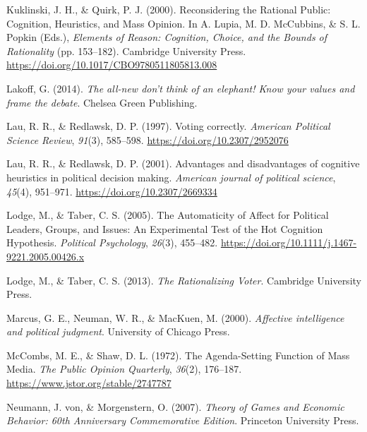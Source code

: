 \documentclass[
]{article}
\newlength{\cslhangindent}
\newlength{\cslentryspacingunit} %
\newenvironment{CSLReferences}[2] %
 {%
  \setlength{\parindent}{0pt}
  \ifodd #1
  \let\oldpar\par
  \def\par{\hangindent=\cslhangindent\oldpar}
  \fi
  \setlength{\parskip}{#2\cslentryspacingunit}
 }%
 {}
\begin{document}
\begin{CSLReferences}{1}{0}
\leavevmode{}%
Kuklinski, J. H., \& Quirk, P. J. (2000). Reconsidering the {Rational
Public}: {Cognition}, {Heuristics}, and {Mass Opinion}. In A. Lupia, M.
D. McCubbins, \& S. L. Popkin (Eds.), \emph{Elements of {Reason}:
{Cognition}, {Choice}, and the {Bounds} of {Rationality}} (pp.
153--182). {Cambridge University Press}.
\url{https://doi.org/10.1017/CBO9780511805813.008}

\leavevmode{}%
Lakoff, G. (2014). \emph{The all-new don't think of an elephant! Know
your values and frame the debate}. {Chelsea Green Publishing}.

\leavevmode{}%
Lau, R. R., \& Redlawsk, D. P. (1997). {Voting correctly}.
\emph{American Political Science Review}, \emph{91}(3), 585--598.
\url{https://doi.org/10.2307/2952076}

\leavevmode{}%
Lau, R. R., \& Redlawsk, D. P. (2001). {Advantages and disadvantages of
cognitive heuristics in political decision making}. \emph{American
journal of political science}, \emph{45}(4), 951--971.
\url{https://doi.org/10.2307/2669334}

\leavevmode{}%
Lodge, M., \& Taber, C. S. (2005). The {Automaticity} of {Affect} for
{Political Leaders}, {Groups}, and {Issues}: {An Experimental Test} of
the {Hot Cognition Hypothesis}. \emph{Political Psychology},
\emph{26}(3), 455--482.
\url{https://doi.org/10.1111/j.1467-9221.2005.00426.x}

\leavevmode{}%
Lodge, M., \& Taber, C. S. (2013). \emph{The {Rationalizing Voter}}.
{Cambridge University Press}.

\leavevmode{}%
Marcus, G. E., Neuman, W. R., \& MacKuen, M. (2000). \emph{Affective
intelligence and political judgment}. {University of Chicago Press}.

\leavevmode{}%
McCombs, M. E., \& Shaw, D. L. (1972). The {Agenda-Setting Function} of
{Mass Media}. \emph{The Public Opinion Quarterly}, \emph{36}(2),
176--187. \url{https://www.jstor.org/stable/2747787}

\leavevmode{}%
Neumann, J. von, \& Morgenstern, O. (2007). \emph{Theory of {Games} and
{Economic Behavior}: 60th {Anniversary Commemorative Edition}}.
{Princeton University Press}.


\end{CSLReferences}
\end{document}
